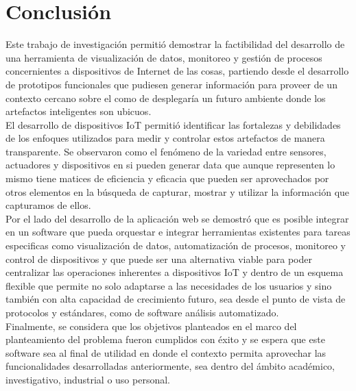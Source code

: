 

\chapter{Conclusión}

Este trabajo de investigación permitió demostrar la factibilidad del desarrollo de una herramienta de visualización de datos, monitoreo y gestión  de procesos concernientes a dispositivos de Internet de las cosas, partiendo desde el desarrollo de prototipos funcionales que pudiesen generar información para proveer de un contexto cercano sobre el como de desplegaría un futuro ambiente donde los artefactos inteligentes son ubicuos.\\

El desarrollo de dispositivos IoT permitió identificar las fortalezas y debilidades de los enfoques utilizados para medir y controlar estos artefactos de manera transparente. Se observaron como el fenómeno de la variedad entre sensores, actuadores y dispositivos en si pueden generar data que aunque representen lo mismo tiene matices de eficiencia y eficacia que pueden ser aprovechados por otros elementos en la búsqueda de capturar, mostrar y utilizar la información que capturamos de ellos.\\

Por el lado del desarrollo de la aplicación web se demostró que es posible integrar en un software que pueda orquestar e integrar herramientas existentes para tareas especificas como visualización de datos, automatización de procesos, monitoreo y control de dispositivos y que puede ser una alternativa viable para poder centralizar las operaciones inherentes a dispositivos IoT y dentro de un esquema flexible que permite no solo adaptarse a las necesidades de los usuarios y  sino también con alta capacidad de crecimiento futuro, sea desde el punto de vista de protocolos y estándares, como de software análisis automatizado.\\

Finalmente, se considera que los objetivos planteados en el marco del planteamiento del problema fueron cumplidos con éxito y se espera que este software sea al final de utilidad en donde el contexto permita aprovechar las funcionalidades desarrolladas anteriormente, sea dentro del ámbito académico, investigativo, industrial o uso personal.

